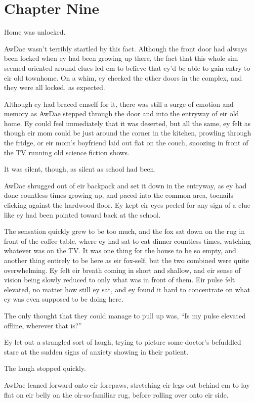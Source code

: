 \chapter*{Chapter Nine}

Home was unlocked.

AwDae wasn't terribly startled by this fact.  Although the front door had always been locked when ey had been growing up there, the fact that this whole sim seemed oriented around clues led em to believe that ey'd be able to gain entry to eir old townhome.  On a whim, ey checked the other doors in the complex, and they were all locked, as expected.

Although ey had braced emself for it, there was still a surge of emotion and memory as AwDae stepped through the door and into the entryway of eir old home.  Ey could feel immediately that it was deserted, but all the same, ey felt as though eir mom could be just around the corner in the kitchen, prowling through the fridge, or eir mom's boyfriend laid out flat on the couch, snoozing in front of the TV running old science fiction shows.

It was silent, though, as silent as school had been.

AwDae shrugged out of eir backpack and set it down in the entryway, as ey had done countless times growing up, and paced into the common area, toenails clicking against the hardwood floor.  Ey kept eir eyes peeled for any sign of a clue like ey had been pointed toward back at the school.

The sensation quickly grew to be too much, and the fox sat down on the rug in front of the coffee table, where ey had sat to eat dinner countless times, watching whatever was on the TV.  It was one thing for the house to be so empty, and another thing entirely to be here as eir fox-self, but the two combined were quite overwhelming.  Ey felt eir breath coming in short and shallow, and eir sense of vision being slowly reduced to only what was in front of them.  Eir pulse felt elevated, no matter how still ey sat, and ey found it hard to concentrate on what ey was even supposed to be doing here.

The only thought that they could manage to pull up was, ``Is my pulse elevated offline, wherever that is?''

Ey let out a strangled sort of laugh, trying to picture some doctor's befuddled stare at the sudden signs of anxiety showing in their patient.

The laugh stopped quickly.

AwDae leaned forward onto eir forepaws, stretching eir legs out behind em to lay flat on eir belly on the oh-so-familiar rug, before rolling over onto eir side.  
